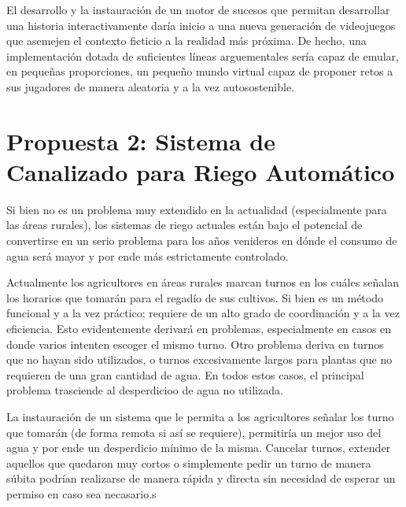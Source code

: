 \documentclass[12pt,conference]{IEEEtran}
\begin{document}
El desarrollo y la instauración de un motor de sucesos que permitan desarrollar una historia interactivamente daría inicio a una nueva generación de videojuegos  que asemejen el contexto ficticio a la realidad más próxima. De hecho, una implementación dotada de suficientes líneas arguementales sería capaz de emular, en pequeñas proporciones, un pequeño mundo virtual capaz de proponer retos a sus jugadores de manera aleatoria y a la vez autosostenible.


\section{Propuesta 2: Sistema de Canalizado para Riego Automático}

Si bien no es un problema muy extendido en la actualidad (especialmente para las áreas rurales), los sistemas de riego actuales están bajo el potencial de convertirse en un serio problema para los años venideros en dónde el consumo de agua será mayor y por ende más estrictamente controlado.

Actualmente los agricultores en áreas rurales marcan turnos en los cuáles señalan los horarios que tomarán para el regadío de sus cultivos. Si bien es un método funcional y a la vez práctico; requiere de un alto grado de coordinación y a la vez eficiencia. Esto evidentemente derivará en problemas, especialmente en casos en donde varios intenten escoger el mismo turno.  Otro problema deriva en turnos que no hayan sido utilizados, o turnos excesivamente largos para plantas que no requieren de una gran cantidad de agua. En todos estos casos, el principal problema trasciende al desperdicioo de agua no utilizada.

La instauración de un sistema que le permita a los agricultores señalar los turno que tomarán (de forma remota si así se requiere), permitiría un mejor uso del agua y por ende un desperdicio mínimo de la misma. Cancelar turnos, extender aquellos que quedaron muy cortos o simplemente pedir un turno de manera súbita podrían realizarse de manera rápida y directa sin necesidad de esperar un permiso en caso sea necasario.s
\end{document}
